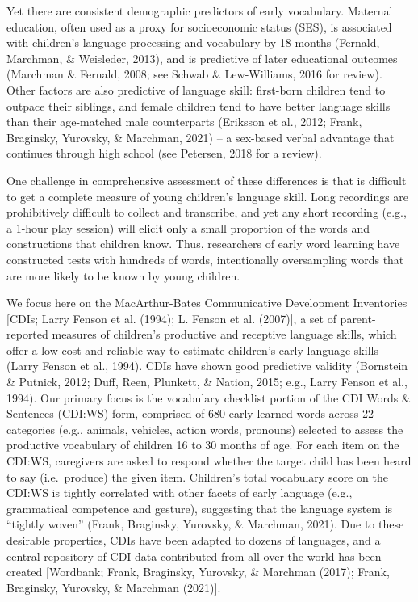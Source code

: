 \documentclass[10pt, letterpaper]{article}
\begin{document}
Yet there are consistent demographic predictors of early vocabulary.
Maternal education, often used as a proxy for socioeconomic status
(SES), is associated with children's language processing and vocabulary
by 18 months (Fernald, Marchman, \& Weisleder, 2013), and is predictive
of later educational outcomes (Marchman \& Fernald, 2008; see Schwab \&
Lew-Williams, 2016 for review). Other factors are also predictive of
language skill: first-born children tend to outpace their siblings, and
female children tend to have better language skills than their
age-matched male counterparts (Eriksson et al., 2012; Frank, Braginsky,
Yurovsky, \& Marchman, 2021) -- a sex-based verbal advantage that
continues through high school (see Petersen, 2018 for a review).

One challenge in comprehensive assessment of these differences is that
is difficult to get a complete measure of young children's language
skill. Long recordings are prohibitively difficult to collect and
transcribe, and yet any short recording (e.g., a 1-hour play session)
will elicit only a small proportion of the words and constructions that
children know. Thus, researchers of early word learning have constructed
tests with hundreds of words, intentionally oversampling words that are
more likely to be known by young children.

We focus here on the MacArthur-Bates Communicative Development
Inventories {[}CDIs; Larry Fenson et al. (1994); L. Fenson et al.
(2007){]}, a set of parent-reported measures of children's productive
and receptive language skills, which offer a low-cost and reliable way
to estimate children's early language skills (Larry Fenson et al.,
1994). CDIs have shown good predictive validity (Bornstein \& Putnick,
2012; Duff, Reen, Plunkett, \& Nation, 2015; e.g., Larry Fenson et al.,
1994). Our primary focus is the vocabulary checklist portion of the CDI
Words \& Sentences (CDI:WS) form, comprised of 680 early-learned words
across 22 categories (e.g., animals, vehicles, action words, pronouns)
selected to assess the productive vocabulary of children 16 to 30 months
of age. For each item on the CDI:WS, caregivers are asked to respond
whether the target child has been heard to say (i.e.~produce) the given
item. Children's total vocabulary score on the CDI:WS is tightly
correlated with other facets of early language (e.g., grammatical
competence and gesture), suggesting that the language system is
``tightly woven'' (Frank, Braginsky, Yurovsky, \& Marchman, 2021). Due
to these desirable properties, CDIs have been adapted to dozens of
languages, and a central repository of CDI data contributed from all
over the world has been created {[}Wordbank; Frank, Braginsky, Yurovsky,
\& Marchman (2017); Frank, Braginsky, Yurovsky, \& Marchman (2021){]}.
\end{document}
